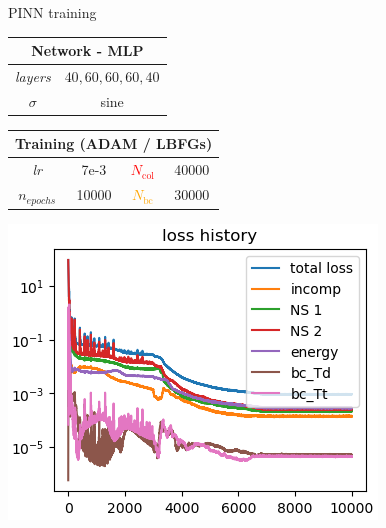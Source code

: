 \begin{frame}{PINN training}
    \vspace{3pt}    
    \begin{center}
        \begin{minipage}{0.72\linewidth}
            \centering\footnotesize
            \begin{table}[htbp]
                \centering
                \begin{tabular}{cc}
                    \toprule
                    \multicolumn{2}{c}{\textbf{Network - MLP}} \\
                    \midrule
                    \textit{layers} & $40,60,60,60,40$ \\
                    \cmidrule(lr){1-2}
                    $\sigma$ & sine \\
                    \bottomrule
                \end{tabular}
                \hspace{0.1cm}
                \begin{tabular}{cccc}
                    \toprule
                    \multicolumn{4}{c}{\textbf{Training} (ADAM / LBFGs)} \\
                    \midrule
                    \textit{lr} & 7e-3 & \textcolor{red}{$N_\text{col}$} & 40000 \\
                    \cmidrule(lr){1-2} \cmidrule(lr){3-4}
                    $n_{epochs}$ & 10000 & \textcolor{orange}{$N_\text{bc}$} & 30000 \\
                    \bottomrule
                \end{tabular}
            \end{table}

        \end{minipage}
        \begin{minipage}{0.26\linewidth}
            \centering
            \includegraphics[width=\linewidth]{images/pinn/training/test4_v5.png}
        \end{minipage}
    \end{center}
    
    \vspace{-5pt}
\end{frame}

